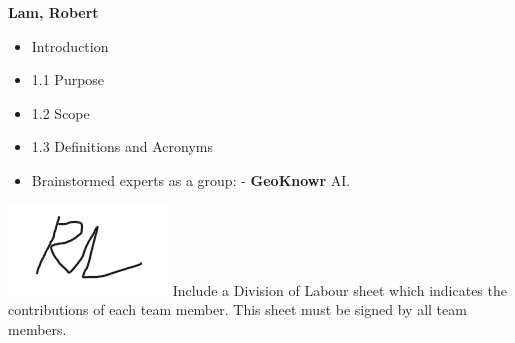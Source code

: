 \documentclass[]{article}
\begin{document}
\textbf{Lam, Robert}
\begin{itemize}
        \item Introduction
        \item 1.1 Purpose
        \item 1.2 Scope
        \item 1.3 Definitions and Acronyms
        \item Brainstormed experts as a group:
		    \subitem - \textbf{GeoKnowr} AI.
\end{itemize}
\includegraphics[scale=1]{robertsignature.png}
Include a Division of Labour sheet which indicates the contributions of each team member. This sheet must be signed by all team members.
\end{document}

